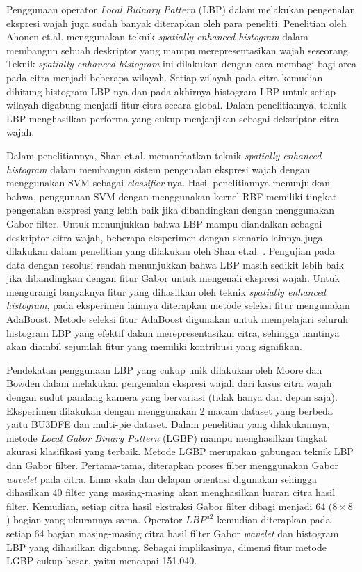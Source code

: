 \documentclass[review,3p,12pt,times]{elsarticle}
\begin{document}
Penggunaan operator \textit{Local Buinary Pattern} (LBP) dalam melakukan pengenalan ekspresi wajah juga sudah banyak diterapkan oleh para peneliti. Penelitian oleh Ahonen et.al. menggunakan teknik \textit{spatially enhanced histogram} \cite{ahonen2006face} dalam membangun sebuah deskriptor yang mampu merepresentasikan wajah seseorang. Teknik \textit{spatially enhanced histogram} ini dilakukan dengan cara membagi-bagi area pada citra menjadi beberapa wilayah. Setiap wilayah pada citra kemudian dihitung histogram LBP-nya dan pada akhirnya histogram LBP untuk setiap wilayah digabung menjadi fitur citra secara global. Dalam penelitiannya, teknik LBP menghasilkan performa yang cukup menjanjikan sebagai deksriptor citra wajah. 

Dalam penelitiannya, Shan et.al. \cite{shan2009facial} memanfaatkan teknik \textit{spatially enhanced histogram} dalam membangun sistem pengenalan ekspresi wajah dengan menggunakan SVM sebagai \textit{classifier}-nya. Hasil penelitiannya menunjukkan bahwa, penggunaan SVM dengan menggunakan kernel RBF memiliki tingkat pengenalan ekspresi yang lebih baik jika dibandingkan dengan menggunakan Gabor filter. Untuk menunjukkan bahwa LBP mampu diandalkan sebagai deskriptor citra wajah, beberapa eksperimen dengan skenario lainnya juga dilakukan dalam penelitian yang dilakukan oleh Shan et.al. \cite{shan2009facial}. Pengujian pada data dengan resolusi rendah menunjukkan bahwa LBP masih sedikit lebih baik jika dibandingkan dengan fitur Gabor untuk mengenali ekspresi wajah. Untuk mengurangi banyaknya fitur yang dihasilkan oleh teknik \textit{spatially enhanced histogram}, pada eksperimen lainnya diterapkan metode seleksi fitur mengunakan AdaBoost. Metode seleksi fitur AdaBoost digunakan untuk mempelajari seluruh histogram LBP yang efektif dalam merepresentasikan citra, sehingga nantinya akan diambil sejumlah fitur yang memiliki kontribusi yang signifikan.

Pendekatan penggunaan LBP yang cukup unik dilakukan oleh Moore dan Bowden \cite{moore2011local} dalam melakukan pengenalan ekspresi wajah dari kasus citra wajah dengan sudut pandang kamera yang bervariasi (tidak hanya dari depan saja). Eksperimen dilakukan dengan menggunakan 2 macam dataset yang berbeda yaitu BU3DFE dan multi-pie dataset. Dalam penelitian yang dilakukannya, metode \textit{Local Gabor Binary Pattern} (LGBP) mampu menghasilkan tingkat akurasi klasifikasi yang terbaik. Metode LGBP merupakan gabungan teknik LBP dan Gabor filter. Pertama-tama, diterapkan proses filter menggunakan Gabor \textit{wavelet} pada citra. Lima skala dan delapan orientasi digunakan sehingga dihasilkan 40 filter yang masing-masing akan menghasilkan luaran citra hasil filter. Kemudian, setiap citra hasil ekstraksi Gabor filter dibagi menjadi 64 ($8\times8$) bagian yang ukurannya sama. Operator $LBP^{u2}$ \cite{ojala2002multiresolution} kemudian diterapkan pada setiap 64 bagian masing-masing citra hasil filter Gabor \textit{wavelet} dan histogram LBP yang dihasilkan digabung. Sebagai implikasinya, dimensi fitur metode LGBP cukup besar, yaitu mencapai 151.040.
\end{document}
